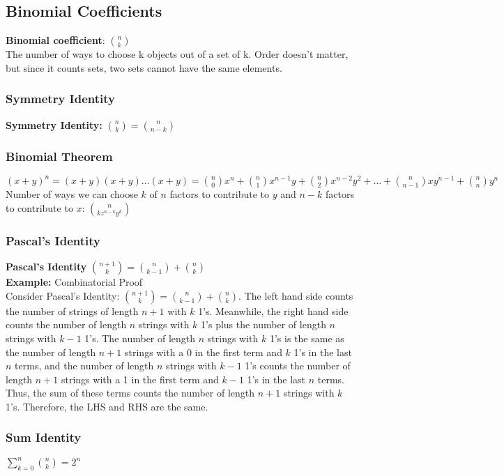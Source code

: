 \documentclass{article}
\begin{document}
\begin{spacing}{1.5}
\subsection{Binomial Coefficients}
\label{sec:binomial}
\textbf{Binomial coefficient}: $\binom{n}{k}$\\
The number of ways to choose k objects out of a set of k. Order doesn't matter, but since it counts sets, two sets cannot have the same elements.
%
\subsubsection{Symmetry Identity}
\label{sec:symmetry}
\textbf{Symmetry Identity:} $\binom{n}{k} = \binom{n}{n-k}$
%
\subsubsection{Binomial Theorem}
\label{sec:btheorem}
$(x+y)^n = (x+y)(x+y) \dots (x+y) = \binom{n}{0}x^n + \binom{n}{1}x^{n-1}y + \binom{n}{2}x^{n-2}y^2 + \dots + \binom{n}{n-1}xy^{n-1} + \binom{n}{n}y^n$\\
Number of ways we can choose $k$ of $n$ factors to contribute to $y$ and $n-k$ factors to contribute to $x$: $\binom{n}{k{z^{n-k}y^k}}$
%
\subsubsection {Pascal's Identity}
\label{sec:pascal}
\textbf{Pascal's Identity} $\binom{n+1}{k} = \binom{n}{k-1} + \binom{n}{k}$\\
\textbf{Example:} Combinatorial Proof\\
Consider Pascal's Identity: $\binom{n+1}{k} = \binom{n}{k-1} + \binom{n}{k}$. The left hand side counts the number of strings of length $n+1$ with $k$ 1's. Meanwhile, the right hand side counts the number of length $n$ strings with $k$ 1's plus the number of length $n$ strings with $k-1$ 1's. The number of length $n$ strings with $k$ 1's is the same as the number of length $n+1$ strings with a 0 in the first term and $k$ 1's in the last $n$ terms, and the number of length $n$ strings with $k-1$ 1's counts the number of length $n+1$ strings with a 1 in the first term and $k-1$ 1's in the last $n$ terms. Thus, the sum of these terms counts the number of length $n+1$ strings with $k$ 1's. Therefore, the LHS and RHS are the same.
%
\subsubsection {Sum Identity}
\label{sec:sidentity}
$\sum_{k=0}^n \binom{n}{k} = 2^n$
%

\end{spacing}
\end{document}
